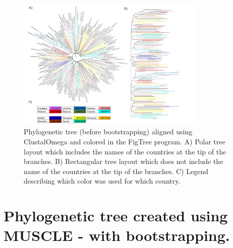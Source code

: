 \begin{figure}[h]
  \centering
  \includegraphics[width=0.8\textwidth]{images/before bootstrapping all.jpeg}
  \caption{Phylogenetic tree (before bootstrapping) aligned using ClustalOmega and colored in the FigTree program. A) Polar tree layout which includes the names of the countries at the tip of the branches. B) Rectangular tree layout which does not include the name of the countries at the tip of the branches. C) Legend describing which color was used for which country.}
  \label{fig: No bootstrapping trees.}
\end{figure}
 
\section{Phylogenetic tree created using MUSCLE - with bootstrapping.}

